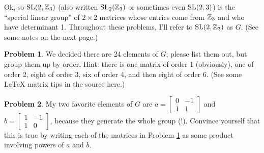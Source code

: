 \documentclass[12pt]{article}
\theoremstyle{definition} %
\newtheorem{problem}{Problem}
\begin{document}
Ok, so $\operatorname{SL}(2, \mathbb{Z}_3)$ (also written $\operatorname{SL}_2(\mathbb{Z}_3)$ or sometimes even $\operatorname{SL}(2,3)$) is the ``special linear group'' of $2\times 2$ matrices whose entries come from $\mathbb{Z}_3$ and who have determinant 1. Throughout these problems, I'll refer to $\operatorname{SL}(2, \mathbb{Z}_3)$ as $G$. (See some notes on the next page.)

\begin{problem}\label{sl23-list}
  We decided there are 24 elements of $G$; please list them out, but group them up by order. Hint: there is one matrix of order 1 (obviously), one of order 2, eight of order 3, six of order 4, and then eight of order 6. (See some LaTeX matrix tips in the source here.)
\end{problem}


\begin{problem} \label{generators}
  My two favorite elements of $G$ are \(a = \begin{bmatrix}0 & -1 \\ 1 & 1\end{bmatrix}\) and \(b = \begin{bmatrix}1& -1 \\ 1 & 0\end{bmatrix}\), because they generate the whole group (!). Convince yourself that this is true by writing each of the matrices in Problem \ref{sl23-list} as some product involving powers of $a$ and $b$.
\end{problem}
\end{document}
